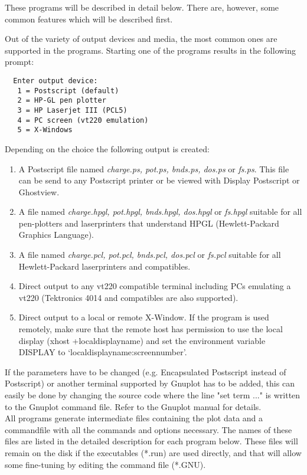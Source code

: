\documentclass[aps,twocolumn,a4]{revtex4}
\begin{document}
These programs will be described in detail below. There are, however, some
common features which will be described first.
\par
Out of the variety of output devices and media, the most common ones are
supported in the programs. Starting one of the programs results in the
following prompt:
\begin{verbatim}
  Enter output device:
   1 = Postscript (default)
   2 = HP-GL pen plotter
   3 = HP Laserjet III (PCL5)
   4 = PC screen (vt220 emulation)
   5 = X-Windows
\end{verbatim}

Depending on the choice the following output is created:
\begin{enumerate}
\item A Postscript file named {\it charge.ps, pot.ps, bnds.ps, dos.ps}
 or {\it fs.ps}. This file can be send to any Postscript printer or
 be viewed
 with Display Postscript or Ghostview.
\item A file named {\it charge.hpgl, pot.hpgl, bnds.hpgl, dos.hpgl} or
 {\it fs.hpgl} suitable for all pen-plotters and laserprinters that understand
 HPGL (Hewlett-Packard Graphics Language).
\item A file named {\it charge.pcl, pot.pcl, bnds.pcl, dos.pcl} or
 {\it fs.pcl} suitable for all Hewlett-Packard laserprinters and compatibles.
\item Direct output to any vt220 compatible terminal including PCs
  emulating a vt220 (Tektronics 4014 and compatibles are also supported).
\item Direct output to a local or remote X-Window. If the
  program is used remotely, make sure that the remote host has
  permission to use
  the local display (xhost +localdisplayname) and set the environment
  variable DISPLAY to `localdisplayname:screennumber'.
\end{enumerate}

If the parameters have to be changed (e.g. Encapsulated Postscript instead
of Postscript) or another terminal supported by Gnuplot has to be
added, this can easily be done by
changing the source code where the line "set term ..." is written
to the Gnuplot command file. Refer to the Gnuplot manual for details.\\

All programs generate intermediate files containing the plot data and
a commandfile with all the commands and options necessary. The names of
these files are listed in the detailed description for each program below.
These files will remain on the disk if the executables (*.run) are used
directly, and that will allow some fine-tuning by editing the command
file (*.GNU).\\
\end{document}
